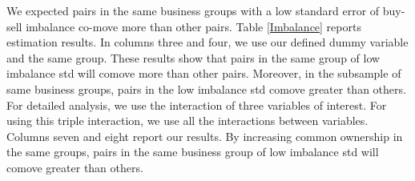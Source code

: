 \begin{LTR}
	We expected pairs in the same business groups with a low standard error of buy-sell imbalance co-move more than other pairs. Table \ref{Imbalance} reports estimation results. In columns three and four, we use our defined dummy variable and the same group. These results show that pairs in the same group of low imbalance std will comove more than other pairs. Moreover, in the subsample of same business groups, pairs in the low imbalance std comove greater than others.  For detailed analysis, we use the interaction of three variables of interest. For using this triple interaction, we use all the interactions between variables. Columns seven and eight report our results. By increasing common ownership in the same groups, pairs in the same business group of low imbalance std will comove greater than others.
	
\end{LTR}
%
%	
%	
%	
%	
%	
%	
%	
%					
